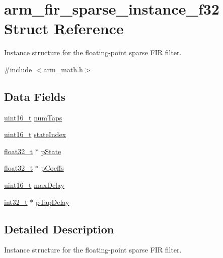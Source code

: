 \hypertarget{structarm__fir__sparse__instance__f32}{\section{arm\-\_\-fir\-\_\-sparse\-\_\-instance\-\_\-f32 Struct Reference}
\label{structarm__fir__sparse__instance__f32}
}


Instance structure for the floating-\/point sparse F\-I\-R filter.  




{\ttfamily \#include $<$arm\-\_\-math.\-h$>$}

\subsection*{Data Fields}
\begin{DoxyCompactItemize}
\item 
\hyperlink{stdint_8h_a273cf69d639a59973b6019625df33e30}{uint16\-\_\-t} \hyperlink{structarm__fir__sparse__instance__f32_a5e19e7f234ac30a3db843352bf2a8515}{num\-Taps}
\item 
\hyperlink{stdint_8h_a273cf69d639a59973b6019625df33e30}{uint16\-\_\-t} \hyperlink{structarm__fir__sparse__instance__f32_a57585aeca9dc8686e08df2865375a86d}{state\-Index}
\item 
\hyperlink{arm__math_8h_a4611b605e45ab401f02cab15c5e38715}{float32\-\_\-t} $\ast$ \hyperlink{structarm__fir__sparse__instance__f32_a794af0916666d11cc564d6df08553555}{p\-State}
\item 
\hyperlink{arm__math_8h_a4611b605e45ab401f02cab15c5e38715}{float32\-\_\-t} $\ast$ \hyperlink{structarm__fir__sparse__instance__f32_a04af7c738dfb0882ad102fcad501d94a}{p\-Coeffs}
\item 
\hyperlink{stdint_8h_a273cf69d639a59973b6019625df33e30}{uint16\-\_\-t} \hyperlink{structarm__fir__sparse__instance__f32_af8b8c775f4084c36774f06c082b4c078}{max\-Delay}
\item 
\hyperlink{group___n_a_m_e_gafd12020da5a235dfcf0c3c748fb5baed}{int32\-\_\-t} $\ast$ \hyperlink{structarm__fir__sparse__instance__f32_aaa54ae67e5d10c6dd0d697945c638d31}{p\-Tap\-Delay}
\end{DoxyCompactItemize}


\subsection{Detailed Description}
Instance structure for the floating-\/point sparse F\-I\-R filter. 

